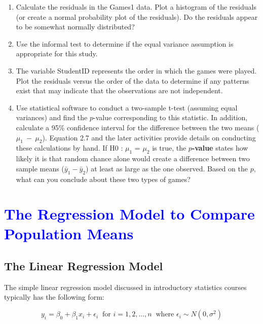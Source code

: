 \documentclass[
]{report}
\begin{document}
\begin{enumerate}
\def\labelenumi{\arabic{enumi}.}
\setcounter{enumi}{6}
\item
  Calculate the residuals in the Games1 data. Plot a histogram of the residuals (or create a normal probability plot of the residuals). Do the residuals appear to be somewhat normally distributed?
\item
  Use the informal test to determine if the equal variance assumption is appropriate for this study.
\item
  The variable StudentID represents the order in which the games were played. Plot the residuals versus the order of the data to determine if any patterns exist that may indicate that the observations are
  not independent.
\item
  Use statistical software to conduct a two-sample t-test (assuming equal variances) and find the \(\scriptstyle p\)-value corresponding to this statistic. In addition, calculate a 95\% confidence interval for the difference between the two means (\(\scriptstyle \mu_1 \ -\  \mu_2\)). Equation 2.7 and the later activities provide details on conducting these calculations by hand. If H0 : \(\scriptstyle \mu_1\) = \(\scriptstyle \mu_2\) is true, the \textbf{\(\scriptstyle p\)-value} states how likely it is that random chance alone would create a difference between two sample means (\(\scriptstyle \bar{y}_1 - \bar{y}_2\)) at least as large as the one observed. Based on the \(\scriptstyle p\), what can you conclude about these two types of
  games?
\end{enumerate}

\hypertarget{section-16}{%
\section{\texorpdfstring{\textcolor{blue}{ The Regression Model to Compare Population Means}}{}}\label{section-16}}

\hypertarget{the-linear-regression-model}{%
\subsection*{The Linear Regression Model}\label{the-linear-regression-model}}

The simple linear regression model discussed in introductory statistics courses typically has the following form:

\begin{equation} \label{2.2}
y_i = \beta_0 + \beta_1x_i + \epsilon_i ~\text{ for } i = 1, 2, ... , n ~\text{ where } \epsilon_i \sim N(0,\sigma^2)
\tag{2.2}
\end{equation}
\end{document}
